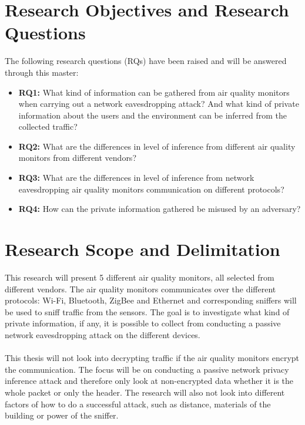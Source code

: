 \section*{Research Objectives and Research Questions}

The following research questions (RQs) have been raised and will be answered through this master:
\begin{itemize}
    \item 
    \textbf{RQ1:} What kind of information can be gathered from air quality monitors when carrying out a network eavesdropping attack? And what kind of private information about the users and the environment can be inferred from the collected traffic?\\
    \item 
    \textbf{RQ2:} What are the differences in level of inference from different air quality monitors from different vendors?\\
    \item
    \textbf{RQ3:} What are the differences in level of inference from network eavesdropping air quality monitors communication on different protocols?\\
    \item 
    \textbf{RQ4:} How can the private information gathered be misused by an adversary?\\
\end{itemize}

\section*{Research Scope and Delimitation}
This research will present 5 different air quality monitors, all selected from different vendors. The air quality monitors communicates over the different protocols: Wi-Fi, Bluetooth, ZigBee and Ethernet and corresponding sniffers will be used to sniff traffic from the sensors. The goal is to investigate what kind of private information, if any, it is possible to collect from conducting a passive network eavesdropping attack on the different devices. 
\\\\
This thesis will not look into decrypting traffic if the air quality monitors encrypt the communication. The focus will be on conducting a passive network privacy inference attack and therefore only look at non-encrypted data whether it is the whole packet or only the header. The research will also not look into different factors of how to do a successful attack, such as distance, materials of the building or power of the sniffer. 

